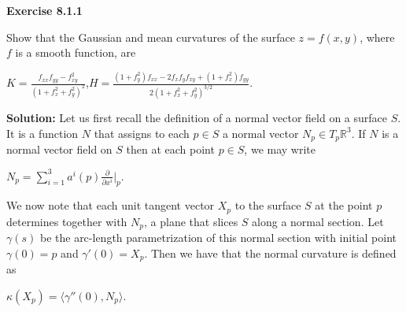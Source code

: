 \documentclass[12pt, a4paper]{article}
\begin{document}
\begin{flushleft}

    \textbf{Exercise 8.1.1}\par
    
\vspace{4mm}

    Show that the Gaussian and mean curvatures of the surface $z=f(x,y)$, where $f$ is a smooth function, are\par
    
\vspace{4mm}

        \centerline{$K=$\Large{$\frac{f_{xx}f_{yy}-f^2_{xy}}{(1+f^2_x+f^2_y)^2}$}\normalsize ,\hspace{4mm}$H=$\Large{$\frac{(1+f^2_y)f_{xx}-2f_xf_yf_{xy}+(1+f^2_x)f_{yy}}{2(1+f^2_x+f^2_y)^{3/2}}$}.}
        
\vspace{4mm}

    \textbf{Solution: }Let us first recall the definition of a normal vector field on a surface $S$. It is a function $N$ that assigns to each $p\in S$ a normal vector $N_p\in T_p\mathbb{R}^3$. If $N$ is a normal vector field on $S$ then at each point $p\in S$, we may write\par
    
\vspace{4mm}

        \centerline{$N_p=\sum\limits_{i=1}^3 a^i(p)\frac{\partial}{\partial x^i}\big|_p$.}
        
\vspace{4mm}

    We now note that each unit tangent vector $X_p$ to the surface $S$ at the point $p$ determines together with $N_p$, a plane that slices $S$ along a normal section. Let $\gamma(s)$ be the arc-length parametrization of this normal section with initial point $\gamma(0)=p$ and $\gamma'(0)=X_p$. Then we have that the normal curvature is defined as\par
    
\vspace{4mm}

            \centerline{$\kappa(X_p)=\langle\gamma''(0), N_p\rangle$.}
        
    
\end{flushleft}

\newpage
\end{document}
